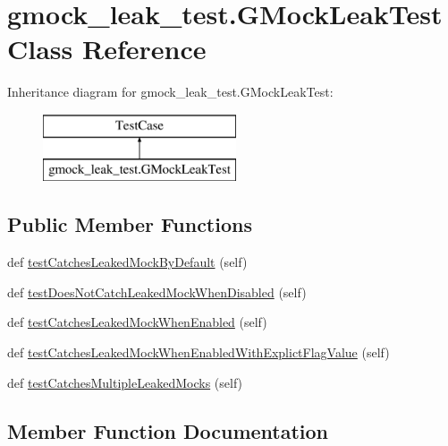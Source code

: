 \hypertarget{classgmock__leak__test_1_1_g_mock_leak_test}{}\section{gmock\+\_\+leak\+\_\+test.\+G\+Mock\+Leak\+Test Class Reference}
\label{classgmock__leak__test_1_1_g_mock_leak_test}
Inheritance diagram for gmock\+\_\+leak\+\_\+test.\+G\+Mock\+Leak\+Test\+:\begin{figure}[H]
\begin{center}
\leavevmode
\includegraphics[height=2.000000cm]{d6/d3c/classgmock__leak__test_1_1_g_mock_leak_test}
\end{center}
\end{figure}
\subsection*{Public Member Functions}
\begin{DoxyCompactItemize}
\item 
def \mbox{\hyperlink{classgmock__leak__test_1_1_g_mock_leak_test_ad87d271de7b3f106e51272d6e9139c76}{test\+Catches\+Leaked\+Mock\+By\+Default}} (self)
\item 
def \mbox{\hyperlink{classgmock__leak__test_1_1_g_mock_leak_test_a3107bf5a603558ab2d97d88fb5589951}{test\+Does\+Not\+Catch\+Leaked\+Mock\+When\+Disabled}} (self)
\item 
def \mbox{\hyperlink{classgmock__leak__test_1_1_g_mock_leak_test_a78f4040a392d183597f71d92da8c1246}{test\+Catches\+Leaked\+Mock\+When\+Enabled}} (self)
\item 
def \mbox{\hyperlink{classgmock__leak__test_1_1_g_mock_leak_test_ab19cf302ea06e1b186bd6ab951d9161e}{test\+Catches\+Leaked\+Mock\+When\+Enabled\+With\+Explict\+Flag\+Value}} (self)
\item 
def \mbox{\hyperlink{classgmock__leak__test_1_1_g_mock_leak_test_a09465b2bfde98834e4bb9563c035f034}{test\+Catches\+Multiple\+Leaked\+Mocks}} (self)
\end{DoxyCompactItemize}


\subsection{Member Function Documentation}
\mbox{\label{classgmock__leak__test_1_1_g_mock_leak_test_ad87d271de7b3f106e51272d6e9139c76}} 
